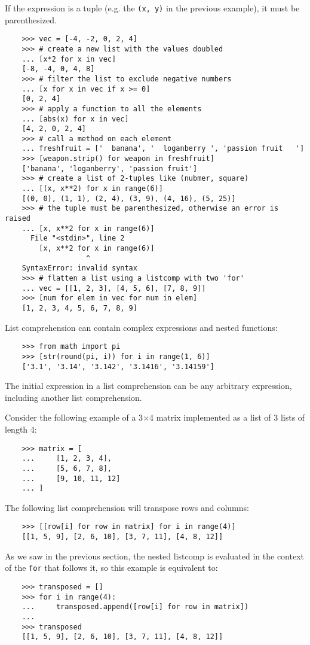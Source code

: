 \documentclass[UTF8]{article}
\begin{document}
If the expression is a tuple (e.g. the \texttt{(x, y)} in the previous example), it must be
parenthesized.
\begin{verbatim}
    >>> vec = [-4, -2, 0, 2, 4]
    >>> # create a new list with the values doubled
    ... [x*2 for x in vec]
    [-8, -4, 0, 4, 8]
    >>> # filter the list to exclude negative numbers
    ... [x for x in vec if x >= 0]
    [0, 2, 4]
    >>> # apply a function to all the elements
    ... [abs(x) for x in vec]
    [4, 2, 0, 2, 4]
    >>> # call a method on each element
    ... freshfruit = ['  banana', '  loganberry ', 'passion fruit   ']
    >>> [weapon.strip() for weapon in freshfruit]
    ['banana', 'loganberry', 'passion fruit']
    >>> # create a list of 2-tuples like (nubmer, square)
    ... [(x, x**2) for x in range(6)]
    [(0, 0), (1, 1), (2, 4), (3, 9), (4, 16), (5, 25)]
    >>> # the tuple must be parenthesized, otherwise an error is raised
    ... [x, x**2 for x in range(6)]
      File "<stdin>", line 2
        [x, x**2 for x in range(6)]
                   ^
    SyntaxError: invalid syntax
    >>> # flatten a list using a listcomp with two 'for'
    ... vec = [[1, 2, 3], [4, 5, 6], [7, 8, 9]]
    >>> [num for elem in vec for num in elem]
    [1, 2, 3, 4, 5, 6, 7, 8, 9]
\end{verbatim}

List comprehension can contain complex expressions and nested functions:
\begin{verbatim}
    >>> from math import pi
    >>> [str(round(pi, i)) for i in range(1, 6)]
    ['3.1', '3.14', '3.142', '3.1416', '3.14159']
\end{verbatim}

The initial expression in a list comprehension can be any arbitrary expression, including another
list comprehension.

Consider the following example of a 3$\times$4 matrix implemented as a list of 3 lists of length 4:
\begin{verbatim}
    >>> matrix = [
    ...     [1, 2, 3, 4],
    ...     [5, 6, 7, 8],
    ...     [9, 10, 11, 12]
    ... ]
\end{verbatim}

The following list comprehension will transpose rows and columns:
\begin{verbatim}
    >>> [[row[i] for row in matrix] for i in range(4)]
    [[1, 5, 9], [2, 6, 10], [3, 7, 11], [4, 8, 12]]
\end{verbatim}

As we saw in the previous section, the nested listcomp is evaluated in the context of the
\texttt{for} that follows it, so this example is equivalent to:
\begin{verbatim}
    >>> transposed = []
    >>> for i in range(4):
    ...     transposed.append([row[i] for row in matrix])
    ...
    >>> transposed
    [[1, 5, 9], [2, 6, 10], [3, 7, 11], [4, 8, 12]]
\end{verbatim}
\end{document}
